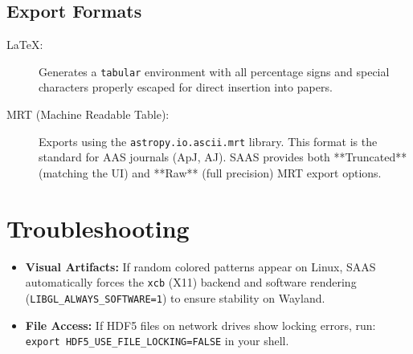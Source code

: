 \documentclass[11pt,a4paper]{article}
\begin{document}
\subsection{Export Formats}
\begin{description}
    \item[LaTeX:] Generates a \texttt{tabular} environment with all percentage signs and special characters properly escaped for direct insertion into papers.
    \item[MRT (Machine Readable Table):] Exports using the \texttt{astropy.io.ascii.mrt} library. This format is the standard for AAS journals (ApJ, AJ). SAAS provides both **Truncated** (matching the UI) and **Raw** (full precision) MRT export options.
\end{description}

\section{Troubleshooting}
\begin{itemize}
    \item \textbf{Visual Artifacts:} If random colored patterns appear on Linux, SAAS automatically forces the \texttt{xcb} (X11) backend and software rendering (\texttt{LIBGL\_ALWAYS\_SOFTWARE=1}) to ensure stability on Wayland.
    \item \textbf{File Access:} If HDF5 files on network drives show locking errors, run: \\ \texttt{export HDF5\_USE\_FILE\_LOCKING=FALSE} in your shell.
\end{itemize}
\end{document}

